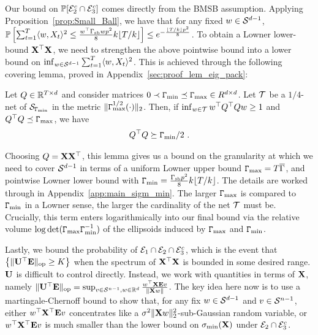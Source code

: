 Our bound on $\mathbb{P}[ \mathcal{E}_2^c \cap \mathcal{E}_3^c]$ comes directly from the BMSB assumption. Applying Proposition~\ref{prop:Small_Ball}, we have that for any fixed $w \in \mathcal{S}^{d-1}$, $ \mathbb{P}\left[\sum_{t=1}^T \langle w, X_t \rangle^2 \le \frac{w^\top\Gamma_{\mathrm{sb}} w p^2}{8} k\lfloor T/k\rfloor\right] \leq   e^{-\frac{\lfloor T/k\rfloor p^2}{8}}$. To obtain a Lowner lower-bound $\mathbf{X}^\top\mathbf{X}$, we need to strengthen the above pointwise bound into a lower bound on $\inf_{w \in \mathcal{S}^{d-1} }\sum_{t=1}^T \langle w, X_t \rangle^2 $. This is achieved through the following covering lemma, proved in Appendix~\ref{sec:proof_lem_eig_pack}:
  \begin{lem}\label{lem:eig_Packing_Lem}
  Let $Q \in \mathbb{R}^{T \times d}$ and consider matrices $0 \prec \mathtt{\Gamma}_{\min} \preceq \mathtt{\Gamma}_{\max} \in R^{d \times d}$. Let $\mathcal{T}$ be a $1/4$-net of $\mathcal{S}_{\mathtt{\Gamma}_{\min}}$ in the metric $\|\mathtt{\Gamma}_{\max}^{1/2}(\cdot)\|_2$. Then, if  $\inf_{w \in \mathcal{T}} w^{\top}Q^\top Qw \ge 1$ and $Q^\top Q \preceq \mathtt{\Gamma}_{\max}$, we have 
  \begin{eqnarray}
  Q^\top Q \succeq \mathtt{\Gamma}_{\min}/2~.
  \end{eqnarray}
  \end{lem}
  Choosing $Q = \mathbf{X}\mathbf{X}^{\top}$, this lemma gives us a bound on the granularity at which we need to cover $\mathcal{S}^{d-1}$ in terms of a uniform Lowner upper bound $\mathtt{\Gamma}_{\max} = T\overline{\Gamma}$, and pointwise Lowner lower bound with $\mathtt{\Gamma}_{\min} = \frac{\Gamma_{\mathrm{sb}} p^2}{8} k\lfloor T/k\rfloor$. The details are worked through in Appendix~\ref{app:main_sigm_min}. The larger $\mathtt{\Gamma}_{\max}$ is compared to $\mathtt{\Gamma}_{\min}$ in a Lowner sense, the larger the cardinality of the net $\mathcal{T}$ must be. Crucially, this term enters logarithmically into our final bound via the relative volume $\log \det (\mathtt{\Gamma}_{\max} \mathtt{\Gamma}_{\min}^{-1})$ of the ellipsoids induced by $\mathtt{\Gamma}_{\max}$ and $\mathtt{\Gamma}_{\min}$. 

  Lastly, we bound the probability of $\mathcal{E}_1 \cap \mathcal{E}_2 \cap \mathcal{E}_3^c$, which is the event that $\left\{ \lVert \mathbf{U}^{\top} \mathbf{E} \rVert_{\mathrm{op}} \geq K \right\} $ when the spectrum of $\mathbf{X}^\top \mathbf{X}$ is bounded in some desired range. $\mathbf{U}$ is difficult to control directly. Instead, we work with quantities in terms of $\mathbf{X}$, namely $\lVert \mathbf{U}^{\top} \mathbf{E} \rVert_{\mathrm{op}} = \sup_{v \in \mathcal{S}^{n-1}, w \in \mathbb{R}^{d}} \frac{w^{\top}\mathbf{X} \mathbf{E} v}{\|\mathbf{X}w\|}$.  The key idea here now is to use a martingale-Chernoff bound to show that, for any fix $w \in \mathcal{S}^{d-1}$ and $v \in \mathcal{S}^{n-1}$, either $w^\top \mathbf{X}^\top \mathbf{E} v$ concentrates like a $\sigma^2 \|\mathbf{X} w\|_2^2$-sub-Gaussian random variable, or $w^\top \mathbf{X}^\top \mathbf{E} v $ is much smaller than the lower bound on $\sigma_{\min}(\mathbf{X})$ under $\mathcal{E}_2 \cap \mathcal{E}_3^c$.

